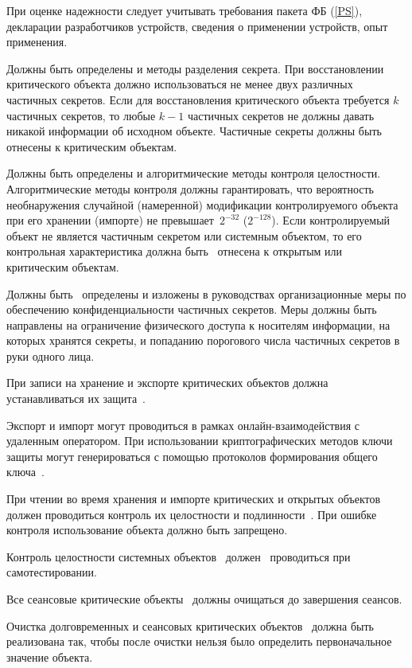 \begin{note}
При оценке надежности следует учитывать требования пакета ФБ (\ref{PS}),
декларации разработчиков устройств, сведения о применении устройств, опыт 
применения.
\end{note}

\label{R.DP.Split}
Должны быть определены и  
методы разделения секрета. При восстановлении критического объекта должно 
использоваться не менее двух различных частичных секретов.
%
Если для восстановления критического объекта требуется $k$ частичных секретов,
то любые $k-1$ частичных секретов не должны давать никакой информации об 
исходном объекте.
%
Частичные секреты должны быть~ отнесены к критическим объектам.

\label{R.DP.Algo}
Должны быть определены и  
алгоритмические методы контроля целостности.
%
Алгоритмические методы контроля должны гарантировать, что 
вероятность необнаружения случайной (намеренной) модификации контролируемого
объекта при его хранении (импорте) не превышает~$2^{-32}$ ($2^{-128}$).
%
Если контролируемый объект не является частичным секретом или системным
объектом, то его контрольная характеристика должна быть~
отнесена к открытым или критическим объектам.

\label{R.DP.Org}
Должны быть~ определены и изложены в 
руководствах организационные меры по обеспечению конфиденциальности частичных 
секретов. Меры должны быть направлены на ограничение физического 
доступа к носителям информации, на которых хранятся секреты, 
и попаданию порогового числа частичных секретов в руки одного лица.

\label{R.DP.Export}
При записи на хранение и экспорте критических объектов должна 
устанавливаться их защита~.

\begin{note}
Экспорт и импорт могут проводиться в рамках онлайн-взаимодействия с удаленным
оператором. При использовании криптографических методов ключи защиты 
могут генерироваться с помощью протоколов формирования общего 
ключа~.
\end{note}

\label{R.DP.Import}
При чтении во время хранения и импорте критических и открытых объектов  
должен проводиться контроль их целостности и подлинности~. 
При ошибке контроля использование объекта должно быть запрещено. 

\label{R.DP.System}
Контроль целостности системных объектов~ 
должен~ проводиться при самотестировании.

\label{R.DP.Session}
Все сеансовые критические объекты~
должны очищаться до завершения сеансов.

\label{R.DP.Zero}
Очистка долговременных и сеансовых критических объектов~ 
должна быть реализована так, чтобы после очистки нельзя было определить 
первоначальное значение объекта. 
